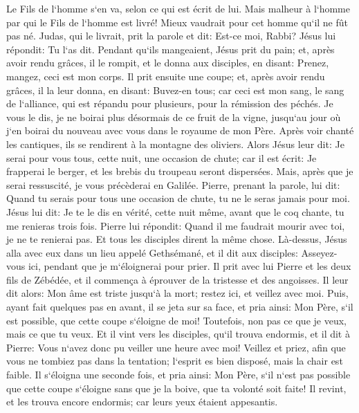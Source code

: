 \verse Le Fils de l`homme s`en va, selon ce qui est écrit de lui. Mais malheur à l`homme par qui le Fils de l`homme est livré! Mieux vaudrait pour cet homme qu`il ne fût pas né. 
\verse Judas, qui le livrait, prit la parole et dit: Est-ce moi, Rabbi? Jésus lui répondit: Tu l`as dit. 
\verse Pendant qu`ils mangeaient, Jésus prit du pain; et, après avoir rendu grâces, il le rompit, et le donna aux disciples, en disant: Prenez, mangez, ceci est mon corps. 
\verse Il prit ensuite une coupe; et, après avoir rendu grâces, il la leur donna, en disant: Buvez-en tous; 
\verse car ceci est mon sang, le sang de l`alliance, qui est répandu pour plusieurs, pour la rémission des péchés. 
\verse Je vous le dis, je ne boirai plus désormais de ce fruit de la vigne, jusqu`au jour où j`en boirai du nouveau avec vous dans le royaume de mon Père. 
\verse Après voir chanté les cantiques, ils se rendirent à la montagne des oliviers. 
\verse Alors Jésus leur dit: Je serai pour vous tous, cette nuit, une occasion de chute; car il est écrit: Je frapperai le berger, et les brebis du troupeau seront dispersées. 
\verse Mais, après que je serai ressuscité, je vous précèderai en Galilée. 
\verse Pierre, prenant la parole, lui dit: Quand tu serais pour tous une occasion de chute, tu ne le seras jamais pour moi. 
\verse Jésus lui dit: Je te le dis en vérité, cette nuit même, avant que le coq chante, tu me renieras trois fois. 
\verse Pierre lui répondit: Quand il me faudrait mourir avec toi, je ne te renierai pas. Et tous les disciples dirent la même chose. 
\verse Là-dessus, Jésus alla avec eux dans un lieu appelé Gethsémané, et il dit aux disciples: Asseyez-vous ici, pendant que je m`éloignerai pour prier. 
\verse Il prit avec lui Pierre et les deux fils de Zébédée, et il commença à éprouver de la tristesse et des angoisses. 
\verse Il leur dit alors: Mon âme est triste jusqu`à la mort; restez ici, et veillez avec moi. 
\verse Puis, ayant fait quelques pas en avant, il se jeta sur sa face, et pria ainsi: Mon Père, s`il est possible, que cette coupe s`éloigne de moi! Toutefois, non pas ce que je veux, mais ce que tu veux. 
\verse Et il vint vers les disciples, qu`il trouva endormis, et il dit à Pierre: Vous n`avez donc pu veiller une heure avec moi! 
\verse Veillez et priez, afin que vous ne tombiez pas dans la tentation; l`esprit es bien disposé, mais la chair est faible. 
\verse Il s`éloigna une seconde fois, et pria ainsi: Mon Père, s`il n`est pas possible que cette coupe s`éloigne sans que je la boive, que ta volonté soit faite! 
\verse Il revint, et les trouva encore endormis; car leurs yeux étaient appesantis. 
